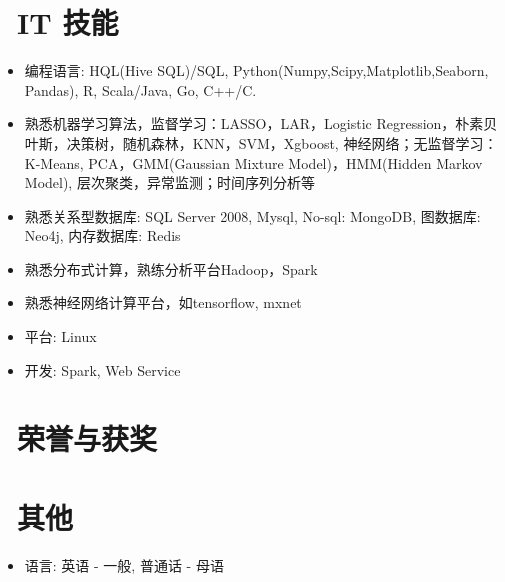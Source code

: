 \documentclass{resume}
\begin{document}
\section{\faCogs\ IT 技能}
\begin{itemize}[parsep=0.5ex]
  \item 编程语言: HQL(Hive SQL)/SQL, Python(Numpy,Scipy,Matplotlib,Seaborn, Pandas), R, Scala/Java, Go, C++/C.
  \item 熟悉机器学习算法，监督学习：LASSO，LAR，Logistic Regression，朴素贝叶斯，决策树，随机森林，KNN，SVM，Xgboost, 神经网络；无监督学习：K-Means, PCA，GMM(Gaussian Mixture Model)，HMM(Hidden Markov Model), 层次聚类，异常监测；时间序列分析等
  \item 熟悉关系型数据库: SQL Server 2008, Mysql, No-sql: MongoDB, 图数据库: Neo4j, 内存数据库: Redis	  
  \item 熟悉分布式计算，熟练分析平台Hadoop，Spark
  \item 熟悉神经网络计算平台，如tensorflow, mxnet	  
  \item 平台: Linux
  \item 开发: Spark, Web Service
\end{itemize}

\section{\faHeartO\ 荣誉与获奖}
\section{\faInfo\ 其他}
\begin{itemize}[parsep=0.5ex]
  \item 语言: 英语 - 一般, 普通话 - 母语
\end{itemize}

%
%
\end{document}
